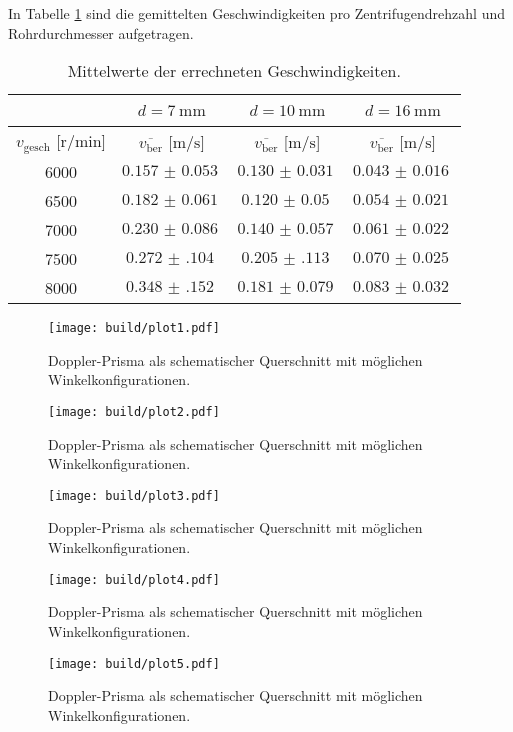 In Tabelle \ref{tab:7} sind die gemittelten Geschwindigkeiten pro Zentrifugendrehzahl und Rohrdurchmesser aufgetragen.

 \begin{table}
     \centering
     \caption{Mittelwerte der errechneten Geschwindigkeiten.}
     \label{tab:7}
     \begin{tabular}{c || c | c | c}
         \multicolumn{1}{c}{~} & \multicolumn{1}{c}{$d = \SI{7}{\milli\meter}$} & \multicolumn{1}{c}{$d = \SI{10}{\milli\meter}$} & \multicolumn{1}{c}{$d = \SI{16}{\milli\meter}$}\\
         \toprule
         $v_{\text{gesch}}$ [$\si{{\text{r}}\per\minute}$]  & $\overline{v_{\text{ber}}}$ [$\si{\meter\per\second}$] &  $\overline{v_{\text{ber}}}$ [$\si{\meter\per\second}$] & $\overline{v_{\text{ber}}}$ [$\si{\meter\per\second}$] \\
         \midrule
         6000    &  $\SI{0.157(53)}{}$    & $\SI{0.130(31)}{}$   & $\SI{0.043(16)}{}$   \\ 
         6500    &  $\SI{0.182(61)}{}$    & $\SI{0.120(50)}{}$   & $\SI{0.054(21)}{}$   \\ 
         7000    &  $\SI{0.230(86)}{}$    & $\SI{0.140(57)}{}$   & $\SI{0.061(22)}{}$   \\ 
         7500    &  $\SI{0.272(104)}{}$   & $\SI{0.205(113)}{}$  & $\SI{0.070(25)}{}$  \\ 
         8000    &  $\SI{0.348(152)}{}$   & $\SI{0.181(79)}{}$   & $\SI{0.083(32)}{}$   \\  
         \bottomrule
     \end{tabular}
 \end{table}

\begin{figure}
    \centering
    \texttt{[image: build/plot1.pdf]}
    \caption{Doppler-Prisma als schematischer Querschnitt mit möglichen Winkelkonfigurationen. \cite{skript}} 
    \label{fig:figskizze1}
\end{figure}
\begin{figure}
    \centering
    \texttt{[image: build/plot2.pdf]}
    \caption{Doppler-Prisma als schematischer Querschnitt mit möglichen Winkelkonfigurationen. \cite{skript}} 
    \label{fig:figskizze1}
\end{figure}
\begin{figure}
    \centering
    \texttt{[image: build/plot3.pdf]}
    \caption{Doppler-Prisma als schematischer Querschnitt mit möglichen Winkelkonfigurationen. \cite{skript}} 
    \label{fig:figskizze1}
\end{figure}
\begin{figure}
    \centering
    \texttt{[image: build/plot4.pdf]}
    \caption{Doppler-Prisma als schematischer Querschnitt mit möglichen Winkelkonfigurationen. \cite{skript}} 
    \label{fig:figskizze1}
\end{figure}
\begin{figure}
    \centering
    \texttt{[image: build/plot5.pdf]}
    \caption{Doppler-Prisma als schematischer Querschnitt mit möglichen Winkelkonfigurationen. \cite{skript}} 
    \label{fig:figskizze1}
\end{figure}

